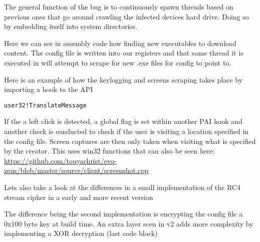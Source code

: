 The general function of the bug is to continuously spawn threads based
on previous ones that go around crawling the infected devices hard
drive. Doing so by embedding itself into system directories.

Here we can see in assembly code how finding new executables to download
content. The config file is written into our registers and that same
thread it is executed in will attempt to scrape for new .exe files for
config to point to.

Here is an example of how the keylogging and screens scraping takes
place by importing a hook to the API

\begin{verbatim}
user32!TranslateMessage
\end{verbatim}

If the a left click is detected, a global flag is set within another PAI
hook and another check is conducted to check if the user is visiting a
location specified in the config file. Screen captures are then only
taken when visiting what is specified by the creator. This uses win32
functions that can also be seen here:
\href{https://github.com/touyachrist/evo-zeus/blob/master/source/client/screenshot.cpp}{https://github.com/touyachrist/evo-zeus/blob/master/source/client/screenshot.cpp}

\begin{Shaded}
\begin{Highlighting}[]
\NormalTok{);}
\NormalTok{, }
\end{Highlighting}
\end{Shaded}

Lets also take a look at the differences in a small implementation of
the RC4 stream cipher in a early and more recent version

The difference being the second implementation is encrypting the config
file a 0x100 byte key at build time. An extra layer scen in v2 adds more
complexity by implementing a XOR decryption (last code block)

